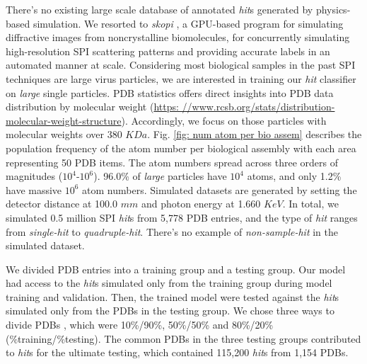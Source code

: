 There's no existing large scale database of annotated \textit{hit}s generated by
physics-based simulation.  We resorted to \textit{skopi}
\cite{peckSkopiSimulationPackage2022}, a GPU-based program for simulating
diffractive images from noncrystalline biomolecules, for concurrently simulating
high-resolution SPI scattering patterns and providing accurate labels in an
automated manner at scale.  Considering most biological samples in the past SPI
techniques are large virus particles, we are interested in training our
\textit{hit} classifier on \textit{large} single particles.  PDB statistics
offers direct insights into PDB data distribution by molecular weight
(\url{https:
//www.rcsb.org/stats/distribution-molecular-weight-structure}).  Accordingly, we
focus on those particles with molecular weights over 380 $KDa$.  Fig.  \ref{fig:
num atom per bio assem} describes the population frequency of the atom number
per biological assembly with each area representing 50 PDB items.  The atom
numbers spread across three orders of magnitudes ($10^4\text{-}10^6$).  96.0\%
of \textit{large} particles have $10^4$ atoms, and only 1.2\% have massive
$10^6$ atom numbers. Simulated datasets are generated by setting the detector
distance at 100.0 $mm$ and photon energy at 1.660 $KeV$.  In total, we simulated
0.5 million SPI \textit{hit}s from 5,778 PDB entries, and the type of
\textit{hit} ranges from \textit{single-hit} to \textit{quadruple-hit}.  There's
no example of \textit{non-sample-hit} in the simulated dataset.

We divided PDB entries into a training group and a testing group.  Our model had
access to the \textit{hit}s simulated only from the training group during model training
and validation.  Then, the trained model were tested against the \textit{hit}s
simulated only from the PDBs in the testing group.  We chose three ways to
divide PDBs , which were 10\%/90\%, 50\%/50\% and 80\%/20\% (\%training/\%testing).  
The common PDBs in the three testing groups contributed to \textit{hit}s for the
ultimate testing, which contained 115,200 \textit{hit}s from 1,154 PDBs.  

